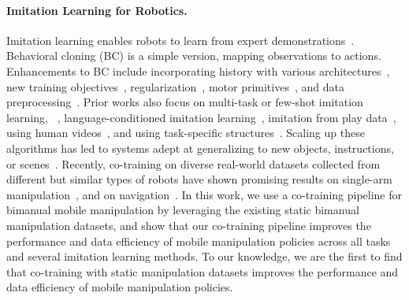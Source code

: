 \documentclass[11pt, a4paper, logo, twocolumn]{stanford}
\begin{document}
\paragraph{Imitation Learning for Robotics.}
Imitation learning
enables robots to learn from expert demonstrations~\cite{Pomerleau1988ALVINNAA}. Behavioral cloning (BC)
is a simple version, mapping observations to actions. Enhancements to BC include incorporating history with various architectures~\cite{Mandlekar2021WhatMI,Shafiullah2022BehaviorTC,Jang2022BCZZT,rt12022arxiv},
new training objectives~\cite{Florence2021ImplicitBC,pari2021surprising,chi2023diffusionpolicy,zhao2023learning,bharadhwaj2023roboagent}, regularization~\cite{Rahmatizadeh2017VisionBasedMM}, motor primitives~\cite{ijspeert2013dynamical,Pastor2009LearningAG,yang2022learning,bahl2021hndp,kober2009learning,paraschos2018using}, and data preprocessing~\cite{shi2023waypoint}. Prior works also focus on multi-task or few-shot imitation learning, 
~\cite{Duan2017OneShotIL,James2018TaskEmbeddedCN,Dasari2020TransformersFO,finn2017one,yu2018one,johns2021coarse,valassakis2022demonstrate,englert2018learning},
language-conditioned imitation learning~\cite{Shridhar2021CLIPortWA,Shridhar2022PerceiverActorAM,Jang2022BCZZT,rt12022arxiv}, imitation from play data~\cite{wang2023mimicplay,lynch2020learning,cui2022play,rosete2023latent}, using human videos~\cite{xiong2021learning,das2021model,smith2019avid,shao2021concept2robot,chen2021learning,edwards2019perceptual,nair2022r3m,Radosavovic2022}, and using task-specific structures~\cite{Zeng2020TransporterNR,Johns2021CoarsetoFineIL,Shridhar2022PerceiverActorAM}. Scaling up these algorithms has led to systems adept at generalizing to new objects, instructions, or scenes~\cite{Ebert2021BridgeDB,Jang2022BCZZT,rt12022arxiv,Kim2022RobotPB,rt22023arxiv}.
Recently, co-training on diverse real-world datasets collected from different but similar types of robots have shown promising results on single-arm manipulation~\cite{open_x_embodiment_rt_x_2023,bousmalis2023robocat,yang2023polybot,octo_2023,fang2023rh20t}, 
and on navigation~\cite{shah2023gnm}. 
In this work, we use a co-training pipeline
for bimanual mobile manipulation by leveraging the existing static bimanual 
manipulation datasets, and show that our co-training pipeline improves the performance and data efficiency of mobile manipulation policies across all tasks and several imitation learning methods. To our knowledge, we are the first to find that co-training with static manipulation datasets improves the performance and data efficiency of mobile manipulation policies.
\end{document}
